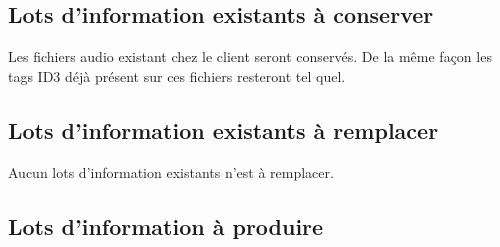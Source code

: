\documentclass[a4paper,12pt]{report}
\begin{document}
\subsection{Lots d'information existants à conserver}

Les fichiers audio existant chez le client seront conservés. De la même façon les tags ID3 déjà présent sur ces fichiers resteront tel quel. 

\subsection{Lots d'information existants à remplacer}

Aucun lots d'information existants n'est à remplacer.

\subsection{Lots d'information à produire}
 
\end{document}
